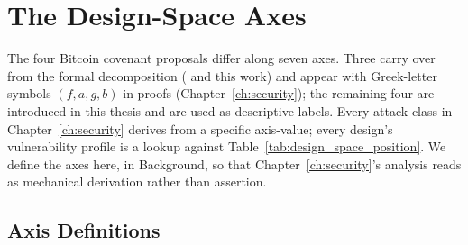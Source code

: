 \section{The Design-Space Axes}
\label{se:design_space_axes}

The four Bitcoin covenant proposals differ along seven axes.
Three carry over from the formal decomposition (\cite{SHMB20,Har24}
and this work) and appear with Greek-letter symbols $(f, a, g, b)$ in
proofs (Chapter~\ref{ch:security}); the remaining four are introduced
in this thesis and are used as descriptive labels. Every attack class
in Chapter~\ref{ch:security} derives from a specific axis-value;
every design's vulnerability profile is a lookup against
Table~\ref{tab:design_space_position}. We define the axes here, in
Background, so that Chapter~\ref{ch:security}'s analysis reads as
mechanical derivation rather than assertion.

\subsection{Axis Definitions}
\label{ss:axis_defs}


